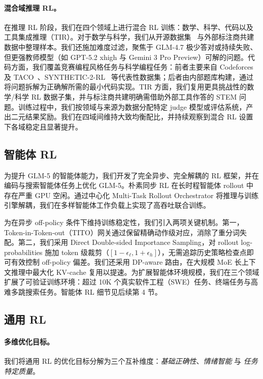 \paragraph{混合域推理 RL。} 在推理 RL 阶段，我们在四个领域上进行混合 RL 训练：数学、科学、代码以及工具集成推理（TIR）。对于数学与科学，我们从开源数据集~\cite{du2025nemotron, moshkov2025aimo} 与外部标注商共建数据中整理样本。我们还施加难度过滤，聚焦于 GLM-4.7 极少答对或持续失败、但更强教师模型（如 GPT-5.2 xhigh 与 Gemini 3 Pro Preview）可解的问题。代码方面，我们覆盖竞赛编程风格任务与科学编程任务：前者主要来自 Codeforces 及 TACO~\cite{li2023taco}、SYNTHETIC-2-RL~\cite{synthetic2_blog_2025} 等代表性数据集；后者由内部题库构建，通过将问题拆解为正确解所需的最小代码实现。TIR 方面，我们复用更具挑战性的数学/科学 RL 数据子集，并与标注商共建明确需借助外部工具作答的 STEM 问题。训练过程中，我们按领域与来源为数据分配特定 judge 模型或评估系统，产出二元结果奖励。我们在四域间维持大致均衡配比，并持续观察到混合 RL 设置下各域稳定且显著提升。

\subsection{智能体 RL}
为提升 GLM-5 的智能体能力，我们开发了完全异步、完全解耦的 RL 框架，并在编码与搜索智能体任务上优化 GLM-5。朴素同步 RL 在长时程智能体 rollout 中存在严重 GPU 空闲。通过中心化 Multi-Task Rollout Orchestrator 将推理与训练引擎解耦，我们在多样智能体工作负载上实现了高吞吐联合训练。

为在异步 off-policy 条件下维持训练稳定性，我们引入两项关键机制。第一，Token-in-Token-out（TITO）网关通过保留精确动作级对应，消除了重分词失配。第二，我们采用 Direct Double-sided Importance Sampling，对 rollout log-probabilities 施加 token 级裁剪（$[1-\epsilon_\ell, 1+\epsilon_h]$），无需追踪历史策略检查点即可有效控制 off-policy 偏差。我们还采用 DP-aware 路由，在大规模 MoE 长上下文推理中最大化 KV-cache 复用以提速。为扩展智能体环境规模，我们在三个领域扩展了可验证训练环境：超过 10K 个真实软件工程（SWE）任务、终端任务与高难多跳搜索任务。智能体 RL 细节见后续第 4 节。

\subsection{通用 RL}

\paragraph{多维优化目标。}
我们将通用 RL 的优化目标分解为三个互补维度：\emph{基础正确性}、\emph{情绪智能} 与 \emph{任务特定质量}。

